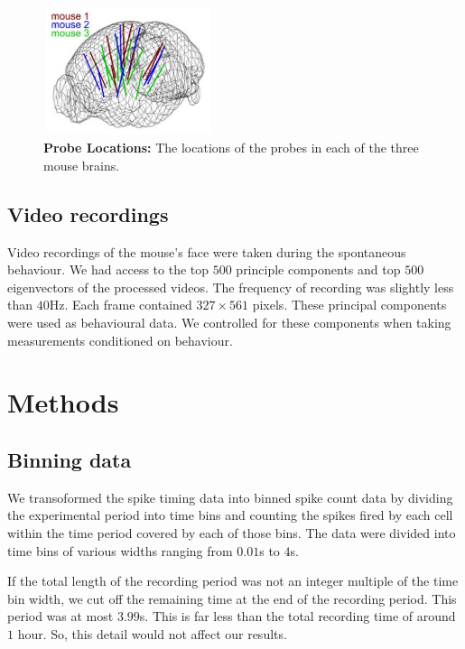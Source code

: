\documentclass[a4paper,12pt]{article}
\theoremstyle{definition}
\begin{document}
    \begin{figure}[h]
        \centering
        \includegraphics[width=5cm,height=3.75cm]{figures/probe_locations_stringer.png}
        \caption{\textbf{Probe Locations:} The locations of the probes in each of the three mouse brains\cite{stringer}.}
        \label{fig:probe_locations}
    \end{figure}

    \subsection{Video recordings}\label{sec:video_recordings}
    Video recordings of the mouse's face were taken during the spontaneous behaviour. We had access to the top $500$ principle components and top $500$ eigenvectors of the processed videos. The frequency of recording was slightly less than $40$Hz. Each frame contained $327 \times 561$ pixels. These principal components were used as behavioural data. We controlled for these components when taking measurements conditioned on behaviour.

\section{Methods}
    \subsection{Binning data}
    We transoformed the spike timing data into binned spike count data by dividing the experimental period into time bins and counting the spikes fired by each cell within the time period covered by each of those bins. The data were divided into time bins of various widths ranging from $0.01$s to $4$s.

    If the total length of the recording period was not an integer multiple of the time bin width, we cut off the remaining time at the end of the recording period. This period was at most $3.99$s. This is far less than the total recording time of around $1$ hour. So, this detail would not affect our results.
\end{document}

